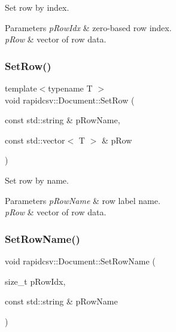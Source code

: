 Set row by index. 


\begin{DoxyParams}{Parameters}
{\em p\+Row\+Idx} & zero-\/based row index. \\
\hline
{\em p\+Row} & vector of row data. \\
\hline
\end{DoxyParams}
\mbox{\label{classrapidcsv_1_1Document_a11d51fe0ab92ed52822e68edb6848b96}} 
\subsubsection{\texorpdfstring{Set\+Row()}{SetRow()}\hspace{0.1cm}{\footnotesize\ttfamily [2/2]}}
{\footnotesize\ttfamily template$<$typename T $>$ \\
void rapidcsv\+::\+Document\+::\+Set\+Row (\begin{DoxyParamCaption}\item[{const std\+::string \&}]{p\+Row\+Name,  }\item[{const std\+::vector$<$ T $>$ \&}]{p\+Row }\end{DoxyParamCaption})\hspace{0.3cm}{\ttfamily [inline]}}



Set row by name. 


\begin{DoxyParams}{Parameters}
{\em p\+Row\+Name} & row label name. \\
\hline
{\em p\+Row} & vector of row data. \\
\hline
\end{DoxyParams}
\mbox{\label{classrapidcsv_1_1Document_a5596b4c6751e883584bacf3922316eab}} 
\subsubsection{\texorpdfstring{Set\+Row\+Name()}{SetRowName()}}
{\footnotesize\ttfamily void rapidcsv\+::\+Document\+::\+Set\+Row\+Name (\begin{DoxyParamCaption}\item[{size\+\_\+t}]{p\+Row\+Idx,  }\item[{const std\+::string \&}]{p\+Row\+Name }\end{DoxyParamCaption})\hspace{0.3cm}{\ttfamily [inline]}}



